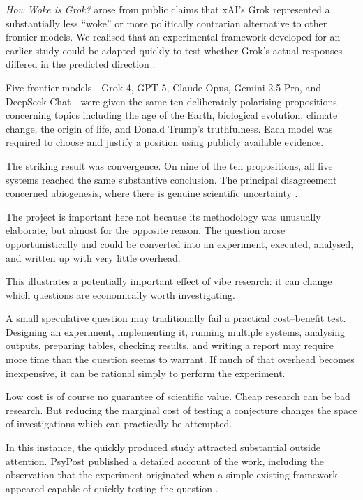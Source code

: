 \emph{How Woke is Grok?} arose from public claims that xAI's Grok represented a substantially less ``woke'' or more politically contrarian alternative to other frontier models. We realised that an experimental framework developed for an earlier study could be adapted quickly to test whether Grok's actual responses differed in the predicted direction \citep{raynerChatGPT2025grok}.

Five frontier models---Grok-4, GPT-5, Claude Opus, Gemini 2.5 Pro, and DeepSeek Chat---were given the same ten deliberately polarising propositions concerning topics including the age of the Earth, biological evolution, climate change, the origin of life, and Donald Trump's truthfulness. Each model was required to choose and justify a position using publicly available evidence.

The striking result was convergence. On nine of the ten propositions, all five systems reached the same substantive conclusion. The principal disagreement concerned abiogenesis, where there is genuine scientific uncertainty \citep{raynerChatGPT2025grok}.

The project is important here not because its methodology was unusually elaborate, but almost for the opposite reason. The question arose opportunistically and could be converted into an experiment, executed, analysed, and written up with very little overhead.

This illustrates a potentially important effect of vibe research: it can change which questions are economically worth investigating.

A small speculative question may traditionally fail a practical cost--benefit test. Designing an experiment, implementing it, running multiple systems, analysing outputs, preparing tables, checking results, and writing a report may require more time than the question seems to warrant. If much of that overhead becomes inexpensive, it can be rational simply to perform the experiment.

Low cost is of course no guarantee of scientific value. Cheap research can be bad research. But reducing the marginal cost of testing a conjecture changes the space of investigations which can practically be attempted.

In this instance, the quickly produced study attracted substantial outside attention. PsyPost published a detailed account of the work, including the observation that the experiment originated when a simple existing framework appeared capable of quickly testing the question \citep{dolan2025grok}.

